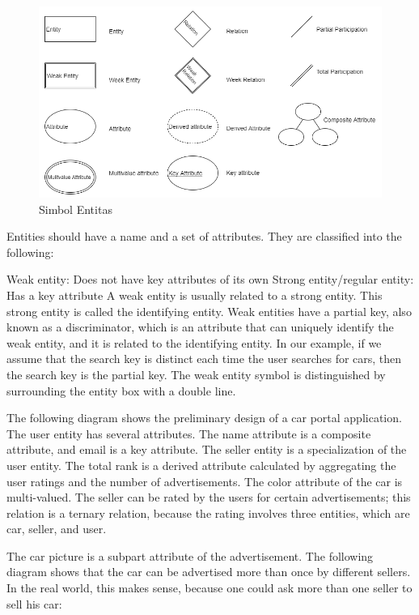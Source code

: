 \documentclass[]{book}
\begin{document}
\begin{figure}

{\centering \includegraphics[width=0.7\linewidth]{img/01/db_model1} 

}

\caption{Simbol Entitas }\label{fig:fig11}
\end{figure}

Entities should have a name and a set of attributes. They are classified into the following:

Weak entity: Does not have key attributes of its own
Strong entity/regular entity: Has a key attribute
A weak entity is usually related to a strong entity. This strong entity is called the identifying entity. Weak entities have a partial key, also known as a discriminator, which is an attribute that can uniquely identify the weak entity, and it is related to the identifying entity. In our example, if we assume that the search key is distinct each time the user searches for cars, then the search key is the partial key. The weak entity symbol is distinguished by surrounding the entity box with a double line.

The following diagram shows the preliminary design of a car portal application. The user entity has several attributes. The name attribute is a composite attribute, and email is a key attribute. The seller entity is a specialization of the user entity. The total rank is a derived attribute calculated by aggregating the user ratings and the number of advertisements. The color attribute of the car is multi-valued. The seller can be rated by the users for certain advertisements; this relation is a ternary relation, because the rating involves three entities, which are car, seller, and user.

The car picture is a subpart attribute of the advertisement. The following diagram shows that the car can be advertised more than once by different sellers. In the real world, this makes sense, because one could ask more than one seller to sell his car:
\end{document}

